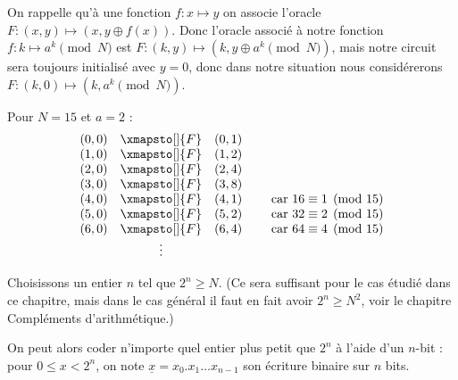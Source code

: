 \documentclass[11pt,class=report,crop=false]{standalone}
\begin{document}
On rappelle qu'à une fonction $f : x \mapsto y$ on associe l'oracle $F : (x,y) \mapsto (x, y \oplus f(x))$. Donc l'oracle associé à notre fonction $f : k \mapsto a^k \pmod N$ est
$F : (k,y) \mapsto (k, y \oplus a^k \pmod N)$, mais notre circuit sera toujours initialisé avec $y=0$, donc dans notre situation nous considérerons $F : (k,0) \mapsto (k, a^k \pmod N)$.



\begin{exemple}
Pour $N=15$ et $a=2$ :
$$\begin{array}{rcl}
(0,0) & \xmapsto[]{F}& (0,1) \\
(1,0) & \xmapsto[]{F}& (1,2) \\
(2,0) & \xmapsto[]{F}& (2,4) \\
(3,0) & \xmapsto[]{F}& (3,8) \\
(4,0) & \xmapsto[]{F}& (4,1) \qquad \text{ car } 16 \equiv 1 \pmod{15} \\
(5,0) & \xmapsto[]{F}& (5,2) \qquad \text{ car } 32 \equiv 2 \pmod{15} \\
(6,0) & \xmapsto[]{F}& (6,4) \qquad \text{ car } 64 \equiv 4 \pmod{15} \\
& \vdots  & \\
\end{array}$$
\end{exemple}


Choisissons un entier $n$ tel que $2^n \ge N$. (Ce sera suffisant pour le cas étudié dans ce chapitre, mais dans le cas général il faut en fait avoir $2^n \ge N^2$, voir le chapitre \og{}Compléments d'arithmétique\fg{}.) 


On peut alors coder n'importe quel entier plus petit que $2^n$ à l'aide d'un  $n$-bit :
pour $0 \le x < 2^n$, on note $\underline{x} = x_0.x_1 \ldots x_{n-1}$ son écriture binaire sur $n$ bits.
\end{document}
